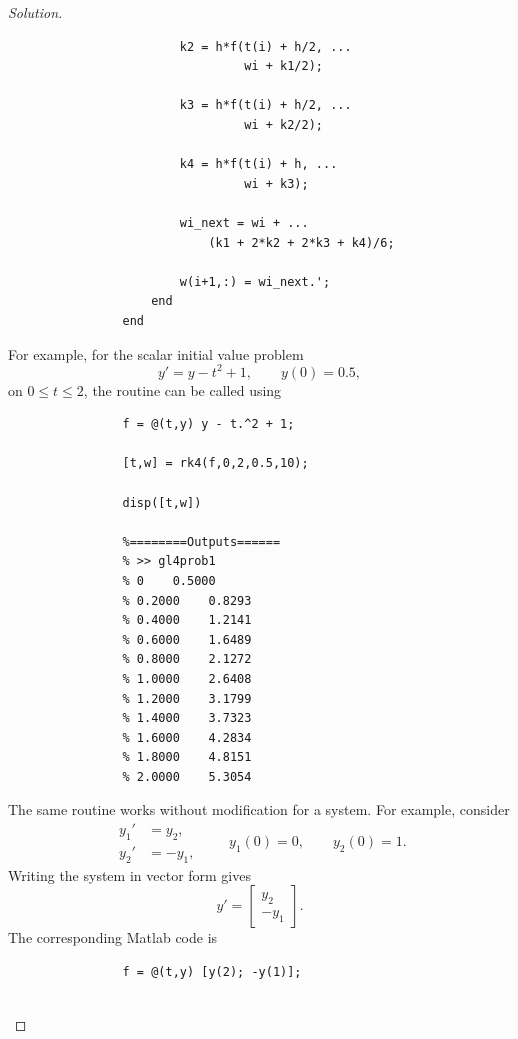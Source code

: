 \documentclass[12pt]{amsart}
\newenvironment{solution}
{\begin{proof}[Solution]}
{\end{proof}}
\begin{document}
\begin{onehalfspace}
\begin{solution}
\begin{lstlisting}
                        k2 = h*f(t(i) + h/2, ...
                                 wi + k1/2);

                        k3 = h*f(t(i) + h/2, ...
                                 wi + k2/2);

                        k4 = h*f(t(i) + h, ...
                                 wi + k3);

                        wi_next = wi + ...
                            (k1 + 2*k2 + 2*k3 + k4)/6;

                        w(i+1,:) = wi_next.';
                    end
                end
            \end{lstlisting}

            For example, for the scalar initial value problem
            \[
                y'=y-t^2+1,\qquad y(0)=0.5,
            \]
            on \(0\leq t\leq2\), the routine can be called using
            \begin{lstlisting}
                f = @(t,y) y - t.^2 + 1;

                [t,w] = rk4(f,0,2,0.5,10);

                disp([t,w])

                %========Outputs======
                % >> gl4prob1
                % 0    0.5000
                % 0.2000    0.8293
                % 0.4000    1.2141
                % 0.6000    1.6489
                % 0.8000    2.1272
                % 1.0000    2.6408
                % 1.2000    3.1799
                % 1.4000    3.7323
                % 1.6000    4.2834
                % 1.8000    4.8151
                % 2.0000    5.3054
            \end{lstlisting}

            The same routine works without modification for a system. For example,
            consider
            \[
                \begin{aligned}
                    y_1' &= y_2,\\
                    y_2' &= -y_1,
                \end{aligned}
                \qquad
                y_1(0)=0,\qquad y_2(0)=1.
            \]
            Writing the system in vector form gives
            \[
                y'=
                \begin{bmatrix}
                    y_2\\
                    -y_1
                \end{bmatrix}.
            \]
            The corresponding Matlab code is
            \begin{lstlisting}
                f = @(t,y) [y(2); -y(1)];


\end{lstlisting}
\end{solution}
\end{onehalfspace}
\end{document}
